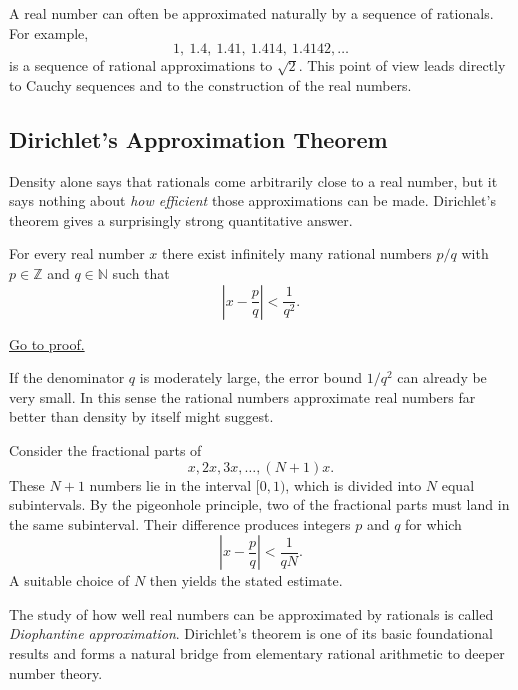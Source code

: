 \begin{remark}
A real number can often be approximated naturally by a sequence of rationals. For example,
\[
1,\ 1.4,\ 1.41,\ 1.414,\ 1.4142,\dots
\]
is a sequence of rational approximations to $\sqrt{2}$. This point of view leads directly to Cauchy
sequences and to the construction of the real numbers.
\end{remark}

\subsection{Dirichlet's Approximation Theorem}

Density alone says that rationals come arbitrarily close to a real number, but it says nothing about
\emph{how efficient} those approximations can be made. Dirichlet's theorem gives a surprisingly strong
quantitative answer.

\begin{theorem}
\label{thm:dirichlet-approx}
For every real number $x$ there exist infinitely many rational numbers $p/q$ with $p \in \mathbb{Z}$ and
$q \in \mathbb{N}$ such that
\[
\left|x - \frac{p}{q}\right| < \frac{1}{q^2}.
\]
\end{theorem}

\begin{remark*}[Proof]
\hyperref[prf:dirichlet-approx]{Go to proof.}
\end{remark*}

\begin{remark}[Interpretation]
If the denominator $q$ is moderately large, the error bound $1/q^2$ can already be very small. In
this sense the rational numbers approximate real numbers far better than density by itself might
suggest.
\end{remark}

\begin{remark}
Consider the fractional parts of
\[
x, 2x, 3x, \dots, (N+1)x.
\]
These $N+1$ numbers lie in the interval $[0,1)$, which is divided into $N$ equal subintervals.
By the pigeonhole principle, two of the fractional parts must land in the same subinterval. Their
difference produces integers $p$ and $q$ for which
\[
\left|x - \frac{p}{q}\right| < \frac{1}{qN}.
\]
A suitable choice of $N$ then yields the stated estimate.
\end{remark}

\begin{remark}
The study of how well real numbers can be approximated by rationals is called
\emph{Diophantine approximation}. Dirichlet's theorem is one of its basic foundational results and
forms a natural bridge from elementary rational arithmetic to deeper number theory.
\end{remark}

